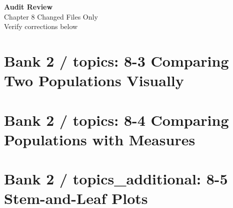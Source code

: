 \documentclass[12pt, fleqn, openany]{studyGuide}
\begin{document}
\begin{center}
\begin{tcolorbox}[
	enhanced,
	colback=white,
	colframe=funTeal!60,
	boxrule=1.5pt,
	arc=10pt,
	outer arc=10pt,
	width=0.9\linewidth,
	halign=center,
	top=5mm, bottom=5mm,
]
	{\Large\bfseries\sffamily\color{funTealDark}Audit Review}\\[2mm]
	{\large\sffamily\color{funGrayDark}Chapter 8 Changed Files Only}\\[2mm]
	{\normalsize\sffamily\color{funGrayDark}Verify corrections below}
\end{tcolorbox}
\end{center}

\newpage
\section*{Bank 2 / topics: 8-3 Comparing Two Populations Visually}


\newpage
\section*{Bank 2 / topics: 8-4 Comparing Populations with Measures}


\newpage
\section*{Bank 2 / topics\_additional: 8-5 Stem-and-Leaf Plots}

\end{document}
